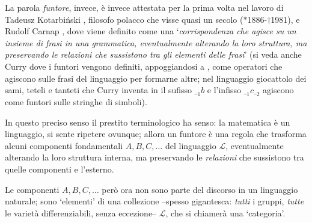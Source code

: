 La parola \emph{funtore}, invece, è invece attestata per la prima volta nel lavoro di Tadeusz Kotarbi\'nski \cite{kotarbione}, filosofo polacco che visse quasi un secolo (\(*\)1886-\(\dag\)1981), e Rudolf Carnap \cite{carnappio}, dove viene definito come una `\emph{corrispondenza che agisce su un insieme di frasi in una grammatica, eventualmente alterando la loro struttura, ma preservando le relazioni che sussistono tra gli elementi delle frasi}' (si veda anche Curry \cite{Curry1961SomeLA} dove i funtori vengono definiti, appoggiandosi a \cite{kotarbione}, come operatori che agiscono sulle frasi del linguaggio per formarne altre; nel linguaggio giocattolo dei sami, teteli e tanteti che Curry inventa in \cite{Curry1961SomeLA} il sufisso \({\_}_1b\) e l'infisso \({\_}_1 c {\_}_2\) agiscono come funtori sulle stringhe di simboli).

\medskip
In questo preciso senso il prestito terminologico ha senso: la matematica è un linguaggio, si sente ripetere ovunque; allora un funtore è una regola che trasforma alcuni componenti fondamentali \(A,B,C,\dots\) del linguaggio \(\mathcal{L}\), eventualmente alterando la loro struttura interna, ma preservando le \emph{relazioni} che sussistono tra quelle componenti e l'esterno.
\begin{figure}
	\begin{center}
	\end{center}
	\caption{}
\end{figure}
Le componenti \(A,B,C,\dots\) però ora non sono parte del discorso in un linguaggio naturale; sono `elementi' di una collezione --spesso gigantesca: \emph{tutti} i gruppi, \emph{tutte} le varietà differenziabili, senza eccezione-- \(\mathcal{L}\), che si chiamerà una `categoria'.


